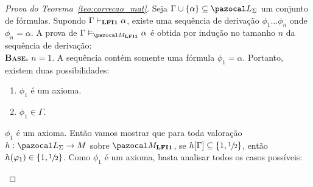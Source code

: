         \begin{proof}[Prova do Teorema~\ref{teo:correcao_mat}]
            Seja $\Gamma \cup \{\alpha\} \subseteq{} \ling{}$ um conjunto de fórmulas.
            Supondo $\Gamma \vdash_{{\normalfont\textbf{LFI1}}{}} \alpha$, existe uma sequência de derivação $\phi_{1} \ldots \phi_{n}$ onde $\phi_{n} = \alpha$. A prova de $\Gamma \conmat \alpha$ é obtida por indução no tamanho $n$ da sequência de derivação:\\

            \noindent \textbf{\textsc{Base.}} $n = 1$. A sequência contém somente uma fórmula $\phi_{1} = \alpha$. Portanto, existem duas possibilidades:
            \begin{enumerate}
                \item $\phi_{1}$ é um axioma.
                \item $\phi_{1} \in \Gamma$.
            \end{enumerate}

            \begin{provaporcasos}
                
                \casodeprova{} $\phi_{1}$ é um axioma. Então vamos mostrar que para toda valoração $h : \ling{} \to M$ sobre $\mat{}$, se $h[\Gamma] \subseteq \{1,\sfrac{1}{2}{}\}{}$, então $h(\varphi_{1}) \in \{1,\sfrac{1}{2}{}\}{}$. Como $\phi_{1}$ é um axioma, basta analisar todos os casos possíveis:


\end{provaporcasos}
\end{proof}

